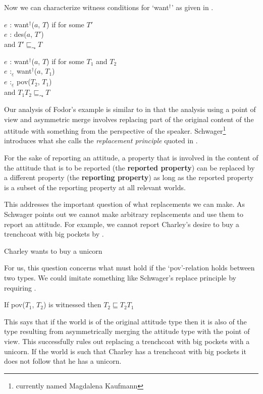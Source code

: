 Now we can characterize witness conditions for `want$^{\dagger}$' as
given in \nexteg{}.
\begin{ex} 
$e$ : want$^{\dagger}$($a$, $T$) if for some $T'$\\
\hspace*{2em} $e$ : des($a$, $T'$) \\
\hspace*{2em} and $T'\sqsubseteq_{\leadsto}T$

$e$ : want$^{\dagger}$($a$, $T$) if for some $T_1$ and $T_2$\\
\hspace*{2em} $e$ :$_{\underline{\varepsilon}}$ want$^{\dagger}$($a$, $T_1$)\\
\hspace*{2em} $e$ :$_{\underline{\varepsilon}}$ pov($T_2$, $T_1$) \\
\hspace*{2em} and $T_1$\fbox{\d{$\wedge$}}$T_2
\sqsubseteq_{\leadsto}T$
\label{ex:wantdagger-witcond}
\end{ex} 
      
Our analysis of Fodor's example is similar to \cite{Schwager2009} in
that the analysis using a point of view and asymmetric merge involves
replacing part of the original content of the attitude with something
from the perspective of the speaker.  Schwager\footnote{currently
  named Magdalena Kaufmann} introduces what she calls the
\textit{replacement principle} quoted in \nexteg{}.
\begin{ex} 
For the sake of reporting an attitude, a property that is involved in
the content of the attitude that is to be reported (the
\textbf{reported property}) can be replaced by a different property
(the \textbf{reporting property}) as long as the reported property is a
subset of the reporting property at all relevant worlds. 

\hfill\cite[p. 409]{Schwager2009} 
\end{ex} 
This addresses the important question of what replacements we can
make.  As Schwager points out we cannot make arbitrary replacements
and use them to report an attitude.  For example, we cannot report
Charley's desire to buy a trenchcoat with big pockets by \nexteg{}.
\begin{ex} 
Charley wants to buy a unicorn 
\end{ex} 
For us, this question concerns what must hold if the `pov'-relation
holds between two types.  We could imitate something like Schwager's
replace principle by requiring \nexteg{}.
\begin{ex} 
If pov($T_1$, $T_2$) is witnessed then $T_2\sqsubseteq T_2$\fbox{\d{$\wedge$}}$T_1$ 
\end{ex} 
This says that if the world is of the original attitude type then it
is also of the type resulting from asymmetrically merging the attitude
type with the point of view.  This successfully rules out replacing a
trenchcoat with big pockets with a unicorn.  If the world is such that
Charley has a trenchcoat with big pockets it does not follow that he
has a unicorn.


